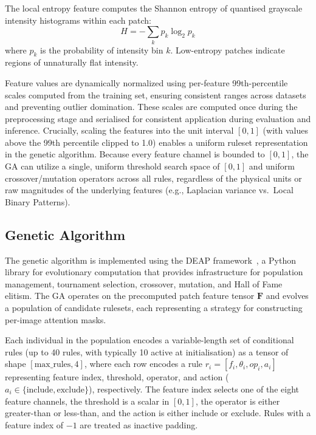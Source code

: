 \documentclass[runningheads]{llncs}
\begin{document}
The local entropy feature computes the Shannon entropy of quantised grayscale intensity histograms within each patch:
\begin{equation}
H = -\sum_{k} p_k \log_2 p_k
\end{equation}
where $p_k$ is the probability of intensity bin $k$. Low-entropy patches indicate regions of unnaturally flat intensity.

Feature values are dynamically normalized using per-feature 99th-percentile scales computed from the training set, ensuring consistent ranges across datasets and preventing outlier domination. These scales are computed once during the preprocessing stage and serialised for consistent application during evaluation and inference. Crucially, scaling the features into the unit interval $[0, 1]$ (with values above the 99th percentile clipped to 1.0) enables a uniform ruleset representation in the genetic algorithm. Because every feature channel is bounded to $[0, 1]$, the GA can utilize a single, uniform threshold search space of $[0, 1]$ and uniform crossover/mutation operators across all rules, regardless of the physical units or raw magnitudes of the underlying features (e.g., Laplacian variance vs.\ Local Binary Patterns).

\subsection{Genetic Algorithm}

The genetic algorithm is implemented using the DEAP framework~\cite{fortin2012deap}, a Python library for evolutionary computation that provides infrastructure for population management, tournament selection, crossover, mutation, and Hall of Fame elitism. The GA operates on the precomputed patch feature tensor $\mathbf{F}$ and evolves a population of candidate rulesets, each representing a strategy for constructing per-image attention masks.

Each individual in the population encodes a variable-length set of conditional rules (up to 40 rules, with typically 10 active at initialisation) as a tensor of shape $[\text{max\_rules}, 4]$, where each row encodes a rule $r_i = [f_i, \theta_i, op_i, a_i]$ representing feature index, threshold, operator, and action ($a_i \in \{\text{include}, \text{exclude}\}$), respectively. The feature index selects one of the eight feature channels, the threshold is a scalar in $[0, 1]$, the operator is either greater-than or less-than, and the action is either include or exclude. Rules with a feature index of $-1$ are treated as inactive padding.
\end{document}
